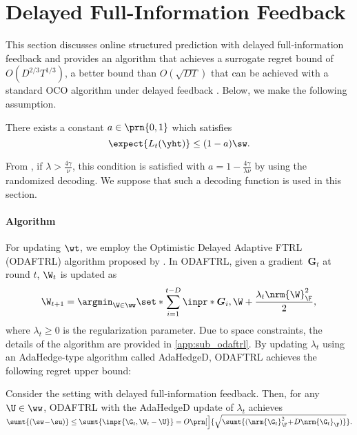 \section{Delayed Full-Information Feedback}
\label{sec:delay}
This section discusses online structured prediction with delayed full-information feedback and provides an algorithm that achieves a surrogate regret bound of $O(D^{2/3} T^{1/3})$, a better bound than $O(\sqrt{D T})$ that can be achieved with a standard OCO algorithm under delayed feedback \citep{joulani13online}. 
Below, we make the following assumption.
\begin{assumption}
\label{asp:delayed_a}
There exists a constant $a\in\prn{0,1}$ which satisfies
\[
    \expect{L_t(\yht)}\leq(1-a)\sw.
\]
\end{assumption}
From , if $\lambda>\frac{4\gamma}{\nu}$, this condition is satisfied with $a=1-\frac{4\gamma}{\lambda\nu}$ by using the randomized decoding. 
We suppose that such a decoding function is used in this section.

\paragraph{Algorithm}
For updating $\wt$, we employ the Optimistic Delayed Adaptive FTRL (ODAFTRL) algorithm proposed by \citet{pmlr-v139-flaspohler21a}.  
In ODAFTRL, given a gradient~$\bm{G}_t$ at round $t$, $\W_t$ is updated as
\begin{equation}
    \W_{t+1}
    =
    \argmin_{\W\in \ww} \set*{ \sum_{i=1}^{t-D} \inpr*{\bm{G}_i,\W}+\frac{\lambda_t \nrm{\W}_{\F}^2}{2} },
    \nonumber
\end{equation}
where $\lambda_t\geq0$ is the regularization parameter.  
Due to space constraints, the details of the algorithm are provided in \cref{app:sub_odaftrl}.
By updating $\lambda_t$ using an AdaHedge-type algorithm called AdaHedgeD,  
ODAFTRL achieves the following regret upper bound:
\begin{lemma}\label{lem:ODAFTRL_bound}
Consider the setting with delayed full-information feedback.
Then, for any $\U\in\ww$, ODAFTRL with the AdaHedgeD update of $\lambda_t$ achieves
$
    \sumt{(\sw\!-\!\su)}
    \leq
    \sumt{\inpr{\G_t, \W_t - \U}}
    =
    O\prn[\Big]{\sqrt{\sumt{(\nrm{\G_t}_\F^2\!+\!D\nrm{\G_t}_\F)}}}.
$
\end{lemma}

